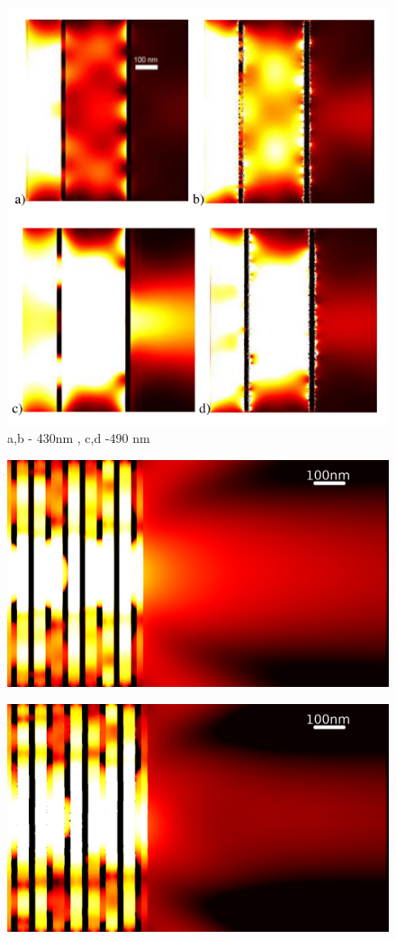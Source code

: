 \begin{figure}
	\includegraphics[width=\textwidth]{images/multilayer/plp-chropo.png}
	\caption{ a,b - 430nm , c,d -490 nm}
\end{figure}

\begin{figure}
	\includegraphics[width=\textwidth]{images/multilayer/oer-rms0.png}
\end{figure}

\begin{figure}
	\includegraphics[width=\textwidth]{images/multilayer/oer-rms01.png}
\end{figure}

